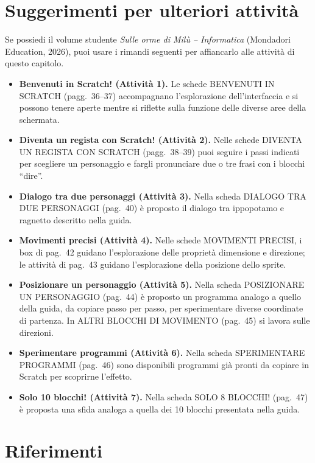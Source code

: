 \section{Suggerimenti per ulteriori attività}\label{suggerimenti-per-ulteriori-attivituxe0-e-riferimenti-5}

\printbibliography[heading=none,keyword={cap8},category={attivita}]

\begin{rimandiquaderno}
Se possiedi il volume studente \emph{Sulle orme di Milù -- Informatica}
(Mondadori Education, 2026), puoi usare i rimandi seguenti per affiancarlo
alle attività di questo capitolo.\par\smallskip

\begin{itemize}[leftmargin=*,itemsep=5pt,topsep=4pt]
\item \textbf{Benvenuti in Scratch! (Attività 1).} Le schede BENVENUTI IN SCRATCH (pagg.~36--37) accompagnano l'esplorazione dell'interfaccia e si possono tenere aperte mentre si riflette sulla funzione delle diverse aree della schermata.
\item \textbf{Diventa un regista con Scratch! (Attività 2).} Nelle schede DIVENTA UN REGISTA CON SCRATCH (pagg.~38--39) puoi seguire i passi indicati per scegliere un personaggio e fargli pronunciare due o tre frasi con i blocchi ``dire''.
\item \textbf{Dialogo tra due personaggi (Attività 3).} Nella scheda DIALOGO TRA DUE PERSONAGGI (pag.~40) è proposto il dialogo tra ippopotamo e ragnetto descritto nella guida.
\item \textbf{Movimenti precisi (Attività 4).} Nelle schede MOVIMENTI PRECISI, i box di pag.~42 guidano l'esplorazione delle proprietà dimensione e direzione; le attività di pag.~43 guidano l'esplorazione della posizione dello sprite.
\item \textbf{Posizionare un personaggio (Attività 5).} Nella scheda POSIZIONARE UN PERSONAGGIO (pag.~44) è proposto un programma analogo a quello della guida, da copiare passo per passo, per sperimentare diverse coordinate di partenza. In ALTRI BLOCCHI DI MOVIMENTO (pag.~45) si lavora sulle direzioni.
\item \textbf{Sperimentare programmi (Attività 6).} Nella scheda SPERIMENTARE PROGRAMMI (pag.~46) sono disponibili programmi già pronti da copiare in Scratch per scoprirne l'effetto.
\item \textbf{Solo 10 blocchi! (Attività 7).} Nella scheda SOLO 8 BLOCCHI! (pag.~47) è proposta una sfida analoga a quella dei 10 blocchi presentata nella guida.
\end{itemize}
\end{rimandiquaderno}

\section{Riferimenti}\label{riferimenti-cap8}

\printbibliography[heading=none,keyword={cap8},notcategory={attivita}]
